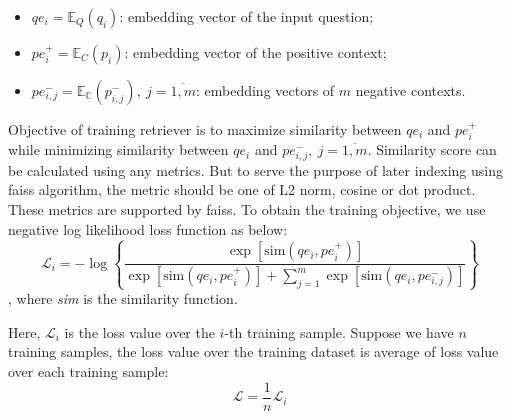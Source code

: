 \documentclass[12pt, sort&compress]{report}
\begin{document}
\begin{itemize}[itemsep=5pt]
	\item $qe_i = \mathbb{E}_Q(q_i)$: embedding vector of the input question;
	\item $pe_i^+ = \mathbb{E}_C(p_i)$: embedding vector of the positive context;
	\item $pe_{i,j}^- = \mathbb{E_C}(p_{i,j}^-), \: j = \overline{1, m}$: embedding vectors of $m$ negative contexts.
\end{itemize}
\par Objective of training retriever is to maximize similarity between $qe_i$ and $pe^+_i$ while minimizing similarity between $qe_i$ and $pe_{i,j}^-, \: j=\overline{1, m}$. Similarity score can be calculated using any metrics. But to serve the purpose of later indexing using faiss algorithm, the metric should be one of L2 norm, cosine or dot product. These metrics are supported by faiss. To obtain the training objective, we use negative log likelihood loss function as below:
\begin{equation}
	\label{eq:01}
	\mathcal{L}_i = -\log\left\{\dfrac{\exp\left[{\text{sim}\left(qe_i, pe_i^+\right)}\right]}{\exp\left[{\text{sim}\left(qe_i, pe_i^+\right)}\right] + \sum\limits_{j=1}^m\exp\left[\text{sim}\left(qe_i, pe_{i,j}^-\right)\right]}\right\}
\end{equation},
where \textit{sim} is the similarity function.
\par Here, $\mathcal{L}_i$ is the loss value over the $i$-th training sample. Suppose we have $n$ training samples, the loss value over the training dataset is average of loss value over each training sample:
\begin{equation}
	\mathcal{L} = \dfrac{1}{n}\mathcal{L}_i
\end{equation}
\end{document}
